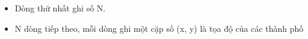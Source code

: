 \begin{itemize}
	\item Dòng thứ nhất ghi số N.
	\item N dòng tiếp theo, mỗi dòng ghi một cặp số (x, y) là tọa độ của các thành phố
\end{itemize}